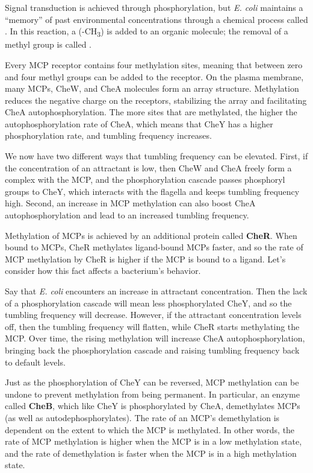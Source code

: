 Signal transduction is achieved through phosphorylation, but \textit{E. coli} maintains a ``memory'' of past environmental concentrations through a chemical process called . In this  reaction, a  (-CH\textsubscript{3}) is added to an organic molecule; the removal of a methyl group is called .

Every MCP receptor contains four methylation sites, meaning that between zero and four methyl groups can be added to the receptor. On the plasma membrane, many MCPs, CheW, and CheA molecules form an array structure. Methylation reduces the negative charge on the receptors, stabilizing the array and facilitating CheA autophosphorylation. The more sites that are methylated, the higher the autophosphorylation rate of CheA, which means that CheY has a higher phosphorylation rate, and tumbling frequency increases.

We now have two different ways that tumbling frequency can be elevated. First, if the concentration of an attractant is low, then CheW and CheA freely form a complex with the MCP, and the phosphorylation cascade passes phosphoryl groups to CheY, which interacts with the flagella and keeps tumbling frequency high. Second, an increase in MCP methylation can also boost CheA autophosphorylation and lead to an increased tumbling frequency.

Methylation of MCPs is achieved by an additional protein called \textbf{CheR}. When bound to MCPs, CheR methylates ligand-bound MCPs faster, and so the rate of MCP methylation by CheR is higher if the MCP is bound to a ligand. Let's consider how this fact affects a bacterium's behavior.

Say that \textit{E. coli} encounters an increase in attractant concentration. Then the lack of a phosphorylation cascade will mean less phosphorylated CheY, and so the tumbling frequency will decrease. However, if the attractant concentration levels off, then the tumbling frequency will flatten, while CheR starts methylating the MCP. Over time, the rising methylation will increase CheA autophosphorylation, bringing back the phosphorylation cascade and raising tumbling frequency back to default levels.

Just as the phosphorylation of CheY can be reversed, MCP methylation can be undone to prevent methylation from being permanent. In particular, an enzyme called \textbf{CheB}, which like CheY is phosphorylated by CheA, demethylates MCPs (as well as autodephosphorylates). The rate of an MCP's demethylation is dependent on the extent to which the MCP is methylated. In other words, the rate of MCP methylation is higher when the MCP is in a low methylation state, and the rate of demethylation is faster when the MCP is in a high methylation state.

